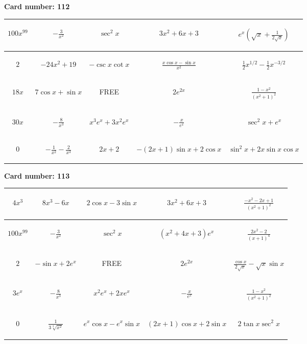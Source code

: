 \documentclass{article}
\newcommand{\entry}[1]{\begin{minipage}[t][2.75cm][t]{4cm} \vspace{1cm} \begin{center}#1\end{center} \end{minipage}}
\newcommand{\freespace}{\entry{FREE}}
\newcommand{\cardnumber}[1]{\noindent \textbf{Card number: #1} \bigskip}
\begin{document}
\pagebreak

\cardnumber{112}
\begin{center}
\begin{tabular}{|*{5}{c|}}
    \hline
    \entry{$100x^{99}$} & \entry{$-\frac{3}{x^2}$} & \entry{$\sec^2 x$} & \entry{$3x^2 + 6x + 3$} & \entry{$e^x \left(\sqrt{x} + \frac{1}{2\sqrt{x}}\right)$} \\ \hline
    \entry{$2$} & \entry{$-24x^2 + 19$} & \entry{$-\csc x \cot x$} & \entry{$\frac{x \cos x - \sin x}{x^2}$} & \entry{$\frac{1}{2} x^{1/2} - \frac{1}{2} x^{-3/2}$} \\ \hline
    \entry{$18x$} & \entry{$7 \cos x + \sin x$} & \freespace & \entry{$2e^{2x}$} & \entry{$\frac{1 - x^2}{(x^2 + 1)^2}$} \\ \hline
    \entry{$30x$} & \entry{$-\frac{8}{x^3}$} & \entry{$x^3 e^x + 3x^2 e^x$} & \entry{$-\frac{x}{e^x}$} & \entry{$\sec^2 x + e^x$} \\ \hline
    \entry{$0$} & \entry{$-\frac{1}{x^2} - \frac{2}{x^3}$} & \entry{$2x + 2$} & \entry{$-(2x + 1) \sin x + 2 \cos x$} & \entry{$\sin^2 x + 2x \sin x \cos x$} \\ \hline
\end{tabular}
\end{center}

\pagebreak

\cardnumber{113}
\begin{center}
\begin{tabular}{|*{5}{c|}}
    \hline
    \entry{$4x^3$} & \entry{$8x^3 - 6x$} & \entry{$2 \cos x - 3 \sin x$} & \entry{$3x^2 + 6x + 3$} & \entry{$\frac{-x^2 - 2x + 1}{(x^2 + 1)^2}$} \\ \hline
    \entry{$100x^{99}$} & \entry{$-\frac{3}{x^2}$} & \entry{$\sec^2 x$} & \entry{$(x^2 + 4x + 3) e^x$} & \entry{$\frac{2x^2 - 2}{(x + 1)^4}$} \\ \hline
    \entry{$2$} & \entry{$-\sin x + 2e^x$} & \freespace & \entry{$2e^{2x}$} & \entry{$\frac{\cos x}{2 \sqrt{x}} - \sqrt{x} \sin x$} \\ \hline
    \entry{$3e^x$} & \entry{$-\frac{8}{x^3}$} & \entry{$x^2 e^x + 2x e^x$} & \entry{$-\frac{x}{e^x}$} & \entry{$\frac{1 - x^2}{(x^2 + 1)^2}$} \\ \hline
    \entry{$0$} & \entry{$\frac{1}{3\sqrt[3]{x^2}}$} & \entry{$e^x \cos x - e^x \sin x$} & \entry{$(2x + 1) \cos x + 2 \sin x$} & \entry{$2 \tan x \sec^2 x$} \\ \hline
\end{tabular}
\end{center}
\end{document}
